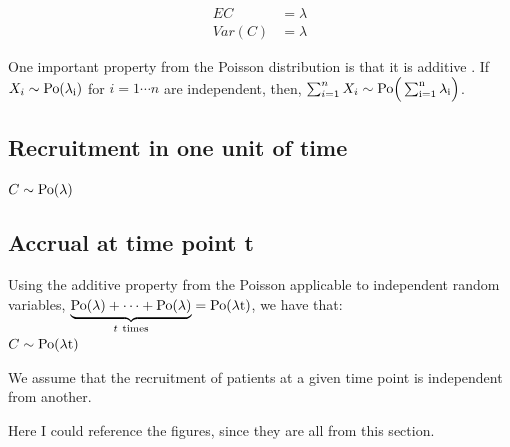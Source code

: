 \begin{align*}
EC & = \lambda\\
Var(C) & = \lambda
\end{align*}

One important property from the Poisson distribution is that it is additive \citep{held2014applied}. If $X_i\sim \rm{Po} (\lambda_i)$ for $i=1\cdots n$ are independent, then, $\sum_{i=1}^n X_i \sim \rm{Po} \Big( \sum_{i=1}^n \lambda_i \Big)$.

\subsection{Recruitment in one unit of time}
$C\sim \rm{Po} (\lambda)$

\subsection{Accrual at time point t}
Using the additive property from the Poisson applicable to independent random variables, $\underbrace{\rm{Po} (\lambda) +\cdots +\rm{Po} (\lambda)}_{t \ \text{times}} = \rm{Po} (\lambda t)$, we have that:\\

$C\sim \rm{Po} (\lambda t)$

We assume that the recruitment of patients at a given time point is independent from another.

Here I could reference the figures, since they are all from this section.

